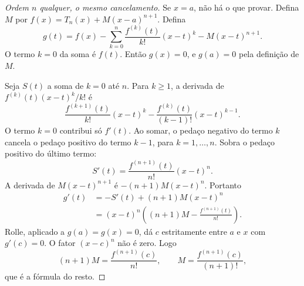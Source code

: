 \documentclass[11pt,a4paper]{article}
\begin{document}
\begin{proof}[Ordem \(n\) qualquer, o mesmo cancelamento]
Se \(x=a\), não há o que provar. Defina \(M\) por \(f(x)=T_n(x)+M(x-a)^{n+1}\). Defina
\[
g(t)=f(x)-\sum_{k=0}^n\frac{f^{(k)}(t)}{k!}(x-t)^k-M(x-t)^{n+1}.
\]
O termo \(k=0\) da soma é \(f(t)\). Então \(g(x)=0\), e \(g(a)=0\) pela definição de \(M\).

Seja \(S(t)\) a soma de \(k=0\) até \(n\). Para \(k\ge 1\), a derivada de \(f^{(k)}(t)(x-t)^k/k!\) é
\[
\frac{f^{(k+1)}(t)}{k!}(x-t)^k-\frac{f^{(k)}(t)}{(k-1)!}(x-t)^{k-1}.
\]
O termo \(k=0\) contribui só \(f'(t)\). Ao somar, o pedaço negativo do termo \(k\) cancela o pedaço positivo do termo \(k-1\), para \(k=1,\ldots,n\). Sobra o pedaço positivo do último termo:
\[
S'(t)=\frac{f^{(n+1)}(t)}{n!}(x-t)^n.
\]
A derivada de \(M(x-t)^{n+1}\) é \(-(n+1)M(x-t)^n\). Portanto
\begin{align*}
g'(t)
&=-S'(t)+(n+1)M(x-t)^n\\
&=(x-t)^n\left((n+1)M-\frac{f^{(n+1)}(t)}{n!}\right).
\end{align*}
Rolle, aplicado a \(g(a)=g(x)=0\), dá \(c\) estritamente entre \(a\) e \(x\) com \(g'(c)=0\). O fator \((x-c)^n\) não é zero. Logo
\[
(n+1)M=\frac{f^{(n+1)}(c)}{n!},
\qquad
M=\frac{f^{(n+1)}(c)}{(n+1)!},
\]
que é a fórmula do resto.
\end{proof}
\end{document}
